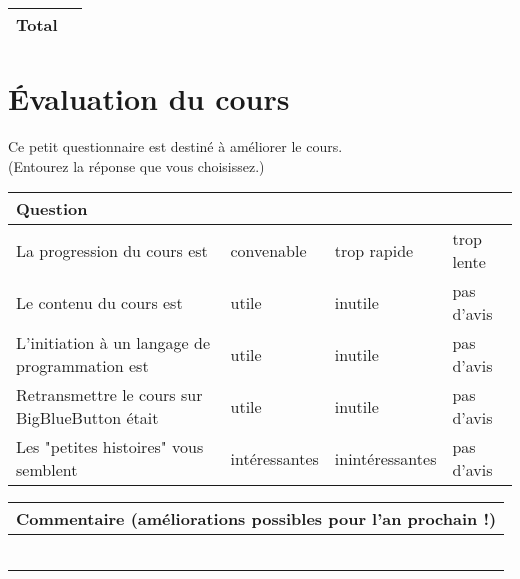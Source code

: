 \documentclass[12pt]{article}
\begin{document}
\begin{center}
\begin{tabular}{| p{3cm} | p{1cm} |}
\hline
Total& \\
\hline
\end{tabular}
\end{center}

\section{\'Evaluation du cours}
\label{eval}

Ce petit questionnaire est destiné à améliorer le cours.\\
(Entourez la réponse que vous choisissez.)

\begin{center}
\begin{tabular}{| p{5cm} | p{3cm} | p{3cm} | p{3cm} |}
\hline
\textbf{Question} & & & \\
\hline
La progression du cours est & convenable & trop rapide & trop lente\\
\hline
Le contenu du cours est & utile & inutile & pas d'avis \\
\hline
L'initiation à un langage de programmation est & utile & inutile & pas d'avis \\
\hline
Retransmettre le cours sur BigBlueButton était & utile & inutile & pas d'avis \\
\hline
Les "petites histoires" vous semblent & intéressantes & inintéressantes & pas d'avis \\
\hline
\end{tabular}
\end{center}

\begin{center}
\begin{tabular}{| p{15cm} |}
\hline
Commentaire (améliorations possibles pour l'an prochain !)\\
\hline
~\\
\vspace{8cm}
\\
\hline
\end{tabular}
\end{center}
\end{document}

